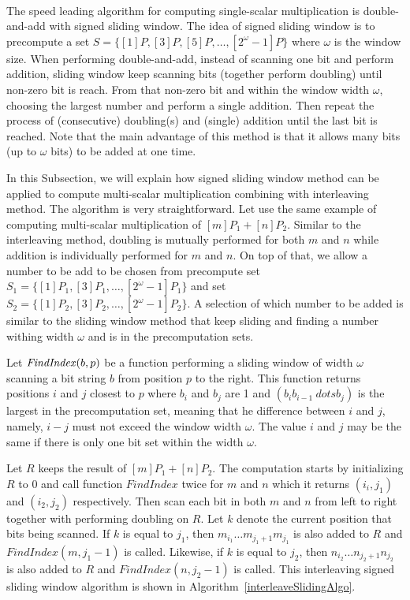  \\
\label{sec:signedslide}
The speed leading algorithm for computing single-scalar multiplication is double-and-add with signed sliding window.
The idea of signed sliding window is to precompute a set $S = \{[1]P, [3]P, [5]P, \dots, [2^{\omega}-1]P\}$ where $\omega$ is the window size.
When performing double-and-add, instead of scanning one bit and perform addition,
sliding window keep scanning bits (together perform doubling) until non-zero bit is reach.
From that non-zero bit and within the window width $\omega$, choosing the largest number and perform a single addition.
Then repeat the process of (consecutive) doubling(s) and (single) addition until the last bit is reached.
Note that the main advantage of this method is that it allows many bits (up to $\omega$ bits) to be added at one time.

In this Subsection, we will explain how signed sliding window method can be applied to compute multi-scalar multiplication combining with interleaving method.
The algorithm is very straightforward.  Let use the same example of computing multi-scalar multiplication of $[m]P_1 + [n]P_2$.
Similar to the interleaving method, doubling is mutually performed for both $m$ and $n$ while addition is individually performed for $m$ and $n$.
On top of that, we allow a number to be add to be chosen from precompute set $S_1 = \{[1]P_1, [3]P_1, \dots, [2^{\omega}-1]P_1\}$
and set $S_2 = \{[1]P_2, [3]P_2, \dots, [2^{\omega}-1]P_2\}$.
A selection of which number to be added is similar to the sliding window method that keep sliding and finding a number withing width $\omega$ and is in the precomputation sets.

Let ${\it{FindIndex}}(b,p)$ be a function performing a sliding window of width $\omega$ scanning a bit string $b$ from position $p$ to the right.
This function returns positions $i$ and $j$ closest to $p$ where $b_i$ and $b_j$ are 1 and $(b_i b_{i-1}\ dots b_j)$ is the largest in the precomputation set,
meaning that he difference between $i$ and $j$, namely, $i-j$ must not exceed the window width $\omega$.
The value $i$ and $j$ may be the same if there is only one bit set within the width $\omega$.

Let $R$ keeps the result of $[m]P_1 + [n]P_2$.  The computation starts by initializing $R$ to $0$ and call function $FindIndex$ twice for $m$ and $n$
which it returns $(i_i,j_1)$ and $(i_2,j_2)$ respectively.
Then scan each bit in both $m$ and $n$ from left to right together with performing doubling on $R$.
Let $k$ denote the current position that bits being scanned.
If $k$ is equal to $j_1$, then $m_{i_1} \dots m_{{j_1}+1} m_{j_1}$ is also added to $R$ and $FindIndex(m,j_1-1)$ is called.
Likewise, if $k$ is equal to $j_2$, then $n_{i_2} \dots n_{{j_2}+1} n_{j_2}$ is also added to $R$ and $FindIndex(n,j_2-1)$ is called.
This interleaving signed sliding window algorithm is shown in Algorithm~\ref{interleaveSlidingAlgo}.


